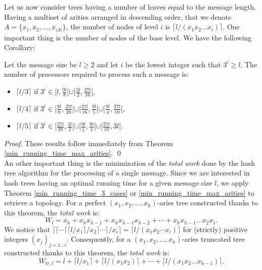 \documentclass{llncs}
\renewenvironment{proof}{\paragraph{Proof} }{\hfill\qed}
\renewcommand{\paragraph}[1]{\noindent\textit{#1}.}
\begin{document}
Let us now consider trees having a number of leaves equal to the message length. 
Having a multiset of arities arranged in descending order, that we denote \break $A=\{x_1,x_2, \ldots, x_{|A|}\}$,
the number of nodes of level $i$ is $\lceil l/(x_1x_2 \ldots x_i) \rceil$. One important thing is the number of nodes 
of the base level. We have the following Corollary:


\begin{corollary}\label{numb_proc}
Let the message size be $l \geq 2$ and let $i$ be the lowest integer such that $3^i \geq l$. 
The number of processors required to process
such a message is:
\begin{itemize}
 \item $\lceil l/3 \rceil$ if $3^i \in [ l, \frac{9l}{8} [ \cup [ \frac{3l}{2}, \frac{27l}{16} [$,
 \item $\lceil l/4 \rceil$ if $3^i \in [ \frac{9l}{8} , \frac{27l}{20} [
 \cup [ \frac{27l}{16} , \frac{9l}{5} [ \cup [ \frac{9l}{4} , \frac{27l}{10} [$,
 
 
 \item $\lceil l/5 \rceil$ if $3^i \in [ \frac{27l}{20} , \frac{3l}{2} [
 \cup [ \frac{9l}{5} , \frac{9l}{4} [ \cup [ \frac{27l}{10} , 3l [$.
\end{itemize}

\end{corollary}

\begin{proof}
These results follow immediately from Theorem \ref{min_running_time_max_arities}.
\end{proof}
~\\





An other important thing is the minimization of the \textit{total work} done by the hash tree algorithm for the processing of a single message. 
Since we are interested in hash trees having an optimal running time for a given message size $l$, 
we apply Theorem \ref{min_running_time_3_cases} or \ref{min_running_time_max_arities} to retrieve a topology.
For a perfect $(x_1,x_2, \ldots, x_h)$-aries tree constructed thanks to this theorem, the \textit{total work} is:
\[W_l=x_h+x_hx_{h-1}+x_hx_{h-1}x_{h-2} + \cdots + x_hx_{h-1}\ldots x_{2}x_1.\]
We notice that $\lceil \lceil \cdots \lceil \lceil l/x_1 \rceil / x_2 \rceil \cdots \rceil/ x_i \rceil = \lceil l/(x_1x_2 \cdots x_i) \rceil$ for (strictly) 
positive integers $(x_j)_{j=1 \ldots i}$. Consequently, for a $(x_1,x_2, \ldots, x_h)$-aries truncated tree constructed thanks to this theorem, the \textit{total work} is:
\[W_{tr,l}=l + \lceil l/x_1 \rceil + \lceil l/(x_1x_2) \rceil + \cdots + \lceil l/(x_1x_2\ldots x_{h-1}) \rceil.\]
\end{document}
